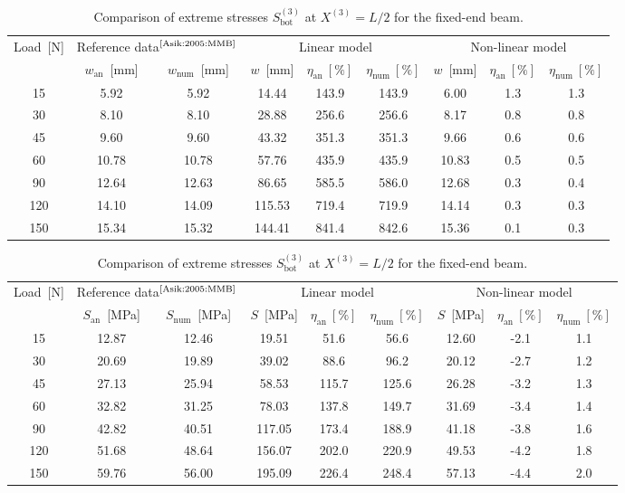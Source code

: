 \documentclass[11pt]{article}
\newcommand{\rev}[1]{#1}
\newcommand{\lay}[1]{^{(#1)}}
\newcommand{\X}[1]{X\lay{#1}}
\newcommand{\wc}[1]{w_0\lay{#1}}
\newcommand{\etanum}{\eta_\mathrm{num}}
\newcommand{\etaan}{\eta_\mathrm{an}}
\begin{document}
\begin{table}[h]
\caption{Comparison of mid-span deflections $\wc{3}$ at $\X{3} = L/2$ for the
fixed-end beam.}
\label{tab:fe_deflection_comparison}
\centering
\begin{tabular}{ccccccccc}
\hline
Load~[N] & 
\multicolumn{2}{c}{Reference data$^\text{\cite{Asik:2005:MMB}}$} &
\multicolumn{3}{c}{Linear model} & 
\multicolumn{3}{c}{Non-linear model} \\
& $w_\mathrm{an}$~[mm] & $w_\mathrm{num}$~[mm] &
$w$~[mm] & $\etaan~[\%]$ & $\etanum~[\%]$ &
$w$~[mm] & $\etaan~[\%]$ & $\etanum~[\%]$ \\
\hline
15  &  5.92 &  5.92	&  14.44 & 143.9 & 143.9 &  6.00 & 1.3 & 1.3 \\
30  &  8.10	&  8.10	&  28.88 & 256.6 & 256.6 &  8.17 & 0.8 & 0.8 \\
45  &  9.60	&  9.60	&  43.32 & 351.3 & 351.3 &  9.66 & 0.6 & 0.6 \\
60  & 10.78	& 10.78 &  57.76 & 435.9 & 435.9 & 10.83 & 0.5 & 0.5 \\
90  & 12.64	& 12.63	&  86.65 & 585.5 & 586.0 & 12.68 & 0.3 & 0.4 \\
120	& 14.10	& 14.09	& 115.53 & 719.4 & 719.9 & 14.14 & 0.3 & 0.3 \\
150	& 15.34	& 15.32	& 144.41 & 841.4 & 842.6 & 15.36 & 0.1 & 0.3 \\
\hline
\end{tabular}
\caption{Comparison of extreme stresses $S\lay{3}_\rev{\mathrm{bot}}$ at $\X{3}
= L/2$ for the fixed-end beam.}
\label{tab:fe_stress_comparison}
\begin{tabular}{ccccccccc}
\hline
Load~[N] & 
\multicolumn{2}{c}{Reference data$^\text{\cite{Asik:2005:MMB}}$} &
\multicolumn{3}{c}{\rev{Linear model}} & 
\multicolumn{3}{c}{Non-linear model} \\
& $S_\mathrm{an}$~[MPa] & $S_\mathrm{num}$~[MPa] &
$S$~[MPa] & $\etaan~[\%]$ & $\etanum~[\%]$ &
$S$~[MPa] & $\etaan~[\%]$ & $\etanum~[\%]$ \\
\hline
15  & 12.87 & 12.46 &  19.51 &  51.6 &  56.6 & 12.60 & -2.1 & 1.1 \\
30  & 20.69 & 19.89 &  39.02 &  88.6 &  96.2 & 20.12 & -2.7	& 1.2 \\
45  & 27.13	& 25.94	&  58.53 & 115.7 & 125.6 & 26.28 & -3.2	& 1.3 \\
60  & 32.82	& 31.25	&  78.03 & 137.8 & 149.7 & 31.69 & -3.4	& 1.4 \\
90  & 42.82	& 40.51	& 117.05 & 173.4 & 188.9 & 41.18 & -3.8	& 1.6 \\
120	& 51.68	& 48.64	& 156.07 & 202.0 & 220.9 & 49.53 & -4.2	& 1.8 \\
150	& 59.76	& 56.00	& 195.09 & 226.4 & 248.4 & 57.13 & -4.4	& 2.0 \\
\hline
\end{tabular}
\end{table}
\end{document}
